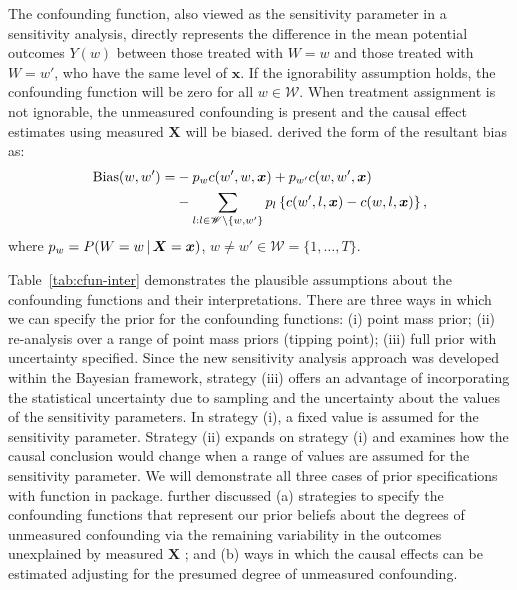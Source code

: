 The  confounding function, also viewed as the sensitivity parameter in a sensitivity analysis, directly represents the difference in the mean potential outcomes $Y(w)$ between those treated with $W=w$ and those treated with $W=w'$, who have the same level of $\bm{x}$.  If the ignorability assumption holds, the confounding function will be zero for all $w \in \mathscr{W}$. When treatment assignment is not ignorable, the unmeasured confounding is present and the causal effect estimates using measured $\bm{X}$ will be biased. \cite{hu2022flexible} derived the form of the resultant bias as: 
\begin{align} \label{eq:biasform}
\begin{split}
\text{Bias}(w,w') =&-p_{w} c(w', w, \bm{x}) + p_{w'}c(w,w',\bm{x})\\
&-\sum\limits_{l: l \in \mathscr{W}\setminus\{w, w'\}} p_{l} \left \{ c(w', l, \bm{x}) -c(w,l,\bm{x}) \right \}, 
\end{split}
\end{align}
where $p_{w} = P(W= w {\, \vert \,} \bm{X}= \bm{x})$, $w \neq w' \in \mathscr{W} = \{1, \ldots, T\} $. 


Table~\ref{tab:cfun-inter} demonstrates the plausible assumptions about the confounding functions and their interpretations.
 There are three ways in which we can specify the prior for the confounding functions: (i) point mass prior; (ii) re-analysis over a range of point mass priors (tipping point); (iii) full prior with uncertainty specified. Since the new sensitivity analysis approach was developed within the Bayesian framework, strategy (iii) offers an advantage of incorporating the statistical uncertainty due to sampling and the uncertainty about the values of the sensitivity parameters. In strategy (i), a fixed value is assumed for the sensitivity parameter. Strategy (ii) expands on strategy (i) and  examines how the causal conclusion would change when a range of values are assumed for the sensitivity parameter. We will demonstrate all three cases of prior specifications with  function in  package. \cite{hu2022flexible} further discussed (a) strategies to specify the confounding functions that represent our prior beliefs about the degrees of unmeasured confounding via the remaining variability in the outcomes unexplained by measured $\bm{X}$ \citep{hogan2014bayesian}; and (b) ways in which the causal effects can be estimated adjusting for the presumed degree of unmeasured confounding. 

